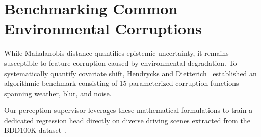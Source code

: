 \section{Benchmarking Common Environmental Corruptions}
While Mahalanobis distance quantifies epistemic uncertainty, it remains susceptible to 
feature corruption caused by environmental degradation. To systematically quantify covariate 
shift, Hendrycks and Dietterich~\cite{hendrycks2019benchmarking} established an algorithmic 
benchmark consisting of 15 parameterized corruption functions spanning weather, blur, and noise. 

Our perception supervisor leverages these mathematical formulations to train a dedicated 
regression head directly on diverse driving scenes extracted from the BDD100K dataset~\cite{yu2020bdd100k}.